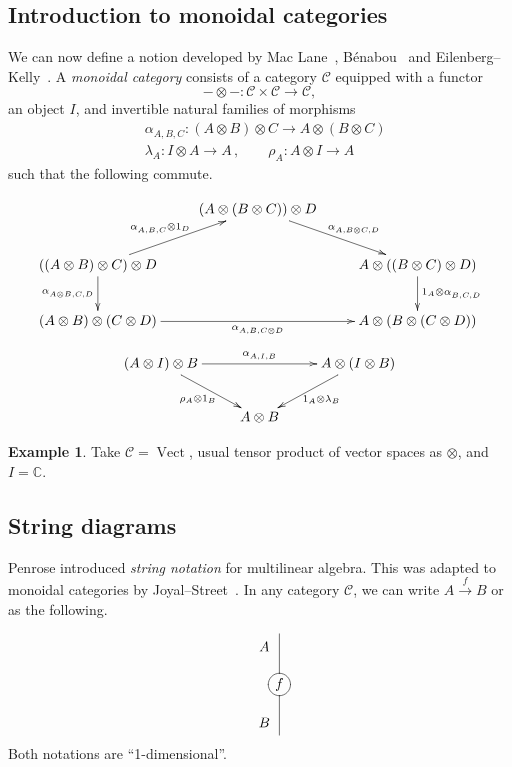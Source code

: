 \documentclass[a4paper,12pt]{article}
\theoremstyle{definition}
\newtheorem*{Example}{Example}%
\theoremstyle{fact}
\theoremstyle{genquest}
\theoremstyle{step}
\newcommand{\catC}{\mathcal{C}}
\newcommand{\CC}{\mathbb{C}}
\newcommand{\Vect}{\operatorname{Vect}}
\newcommand{\longto}{\longrightarrow}
\begin{document}
\subsection{Introduction to monoidal categories}

We can now define a notion developed by Mac Lane~\cite{ML1963}, 
B\'enabou~\cite{Ben1963} and Eilenberg--Kelly~\cite{EilKel1966}. 
A \emph{monoidal category} consists of a category $\catC$ equipped with a functor
\[
- \otimes - : \catC \times \catC \longto \catC,
\]
an object $I$, and invertible natural families of morphisms
\begin{align*}
 & \alpha^{}_{A,B,C} : (A \otimes B) \otimes C \longto A \otimes (B \otimes C)\\
 & \lambda_A : I \otimes A \longto A\,, \qquad \rho_A : A \otimes I \longto A
\end{align*}
such that the following commute.

\[
\xymatrix{
& (A \otimes (B \otimes C)) \otimes D \ar[rd]^-{\phantom{A}\alpha^{}_{A,B\otimes C,D}}  & \\
((A \otimes B )\otimes C) \otimes D \ar[ru]^-{\alpha^{}_{A,B,C}\otimes 1_{D}\phantom{A}} \ar[d]_-{\alpha^{}_{A\otimes B,C,D}} & & A \otimes ((B \otimes C) \otimes D ) \ar[d]^-{1_{A}\otimes\alpha^{}_{B,C,D}} \\
(A \otimes B) \otimes (C \otimes D) \ar[rr]_-{\alpha^{}_{A,B,C\otimes D }} & & A \otimes (B \otimes (C \otimes D)) 
}\] 
\[
\xymatrix{(A \otimes I)\otimes B \ar[rr]^{\alpha^{}_{A,I,B}} \ar[rd]_{\rho_A \otimes 1_B} 
& & A \otimes (I \otimes B) \ar[ld]^{1_A \otimes \lambda_B} \\
& A \otimes B}
\]

\begin{Example} 
Take $\catC = \Vect $, usual tensor product of vector spaces as $\otimes$, and $I = \CC$.
\end{Example}

\subsection{String diagrams}

Penrose introduced \emph{string notation} for multilinear algebra.
This was adapted to monoidal categories by Joyal--Street~\cite{GTC}.
In any category $\catC$, we can write $A \stackrel{f}{\longto} B$ or as the following. 

 \[ 
 \xygraph{{f} *\xycircle<8pt>{-}="m" "m"(-[u] [l(.3)d(.25)] {A},-[d] [l(.3)u(.25)] {B})}
\] 
Both notations are ``1-dimensional''.
\end{document}
